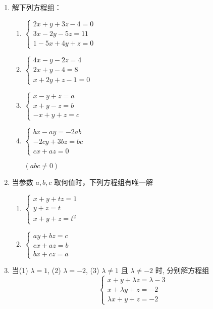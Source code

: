 \begin{enumerate}
\item 解下列方程组：
\begin{multicols}{2}
    \begin{enumerate}
    \item $\begin{cases}2 x+y+3 z-4=0 \\ 3 x-2 y-5 z=11 \\ 1-5 x+4 y+z=0\end{cases}$
    \item $\begin{cases}4 x-y-2 z=4 \\ 2 x+y-4=8 \\ x+2 y+z-1=0\end{cases}$
    \item $\begin{cases} x-y+z =a \\ x+y-z =b \\-x+y+z =c \end{cases}$
    \item $\begin{cases}b x-a y=-2 a b \\ -2 c y+3 b z=b c \\ c x+a z=0\end{cases} $
   
    $(a b c \neq 0)$
\end{enumerate}
\end{multicols}


\item 
当参数 $a,b,c$ 取何值时，下列方程组有唯一解
\begin{multicols}{2}
\begin{enumerate}
    \item $\begin{cases}x+y+t z=1  \\ y+z  =t \\ x+y+z  =t^{2}\end{cases}$
    \item $\begin{cases}a y+b z=c \\ c x+a z=b \\ b x+c z=a\end{cases}$
\end{enumerate}
\end{multicols}

\item 当(1) $\lambda=1$, (2) $\lambda=-2$, (3) $\lambda \neq 1$ 且 $\lambda\ne -2$ 时, 分别解方程组
$$
\begin{cases}
x+y+\lambda z=\lambda-3 \\
x+\lambda y+z=-2 \\
\lambda x+y+z=-2
\end{cases}
$$


\end{enumerate}
